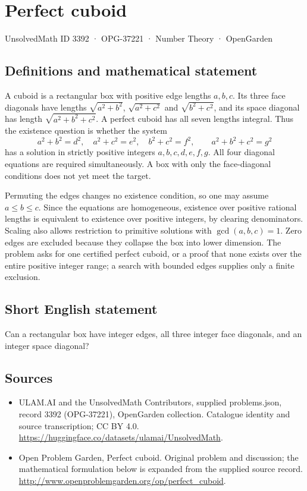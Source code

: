 \documentclass[11pt,a4paper]{article}
\begin{document}
\section*{Perfect cuboid}\label{3392}
{\small UnsolvedMath ID 3392 · OPG-37221 · Number Theory · OpenGarden}
\subsection{Definitions and mathematical statement}
A cuboid is a rectangular box with positive edge lengths $a,b,c$.
Its three face diagonals have lengths
$\sqrt{a^2+b^2}$, $\sqrt{a^2+c^2}$ and $\sqrt{b^2+c^2}$, and
its space diagonal has length $\sqrt{a^2+b^2+c^2}$. A perfect cuboid
has all seven lengths integral. Thus the existence question is
whether the system
\[
 a^2+b^2=d^2,\quad a^2+c^2=e^2,\quad b^2+c^2=f^2,
 \qquad a^2+b^2+c^2=g^2
\]
has a solution in strictly positive integers $a,b,c,d,e,f,g$.
All four diagonal equations are required simultaneously. A box
with only the face-diagonal conditions does not yet meet the target.

Permuting the edges changes no existence condition, so one may
assume $a\le b\le c$. Since the equations are homogeneous,
existence over positive rational lengths is equivalent to existence
over positive integers, by clearing denominators. Scaling also
allows restriction to primitive solutions with $\gcd(a,b,c)=1$.
Zero edges are excluded because they collapse the box into lower
dimension. The problem asks for one certified perfect cuboid, or
a proof that none exists over the entire positive integer range;
a search with bounded edges supplies only a finite exclusion.
\subsection{Short English statement}
Can a rectangular box have integer edges, all three integer face diagonals, and an integer space diagonal?
\subsection{Sources}
\begin{itemize}
\item[S1] ULAM.AI and the UnsolvedMath Contributors, supplied problems.json, record 3392 (OPG-37221), OpenGarden collection. Catalogue identity and source transcription; CC BY 4.0.
\url{https://huggingface.co/datasets/ulamai/UnsolvedMath}.
\item[S2] Open Problem Garden, Perfect cuboid. Original problem and discussion; the mathematical formulation below is expanded from the supplied source record.
\url{http://www.openproblemgarden.org/op/perfect_cuboid}.
\end{itemize}
\end{document}
